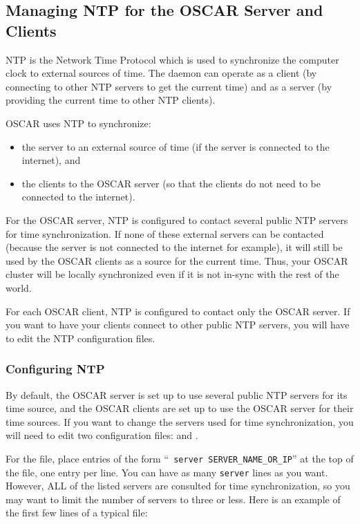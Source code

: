 %
%
%

\subsection{Managing NTP for the OSCAR Server and Clients}
\label{app:ntp-overview}

NTP is the Network Time Protocol which is used to synchronize the
computer clock to external sources of time.  The  daemon
can operate as a client (by connecting to other NTP servers to get the
current time) and as a server (by providing the current time to other
NTP clients).

\bigskip

OSCAR uses NTP to synchronize:
\begin{itemize}
\item the server to an external source of time (if the server is
  connected to the internet), and
\item the clients to the OSCAR server (so that the clients do not need
  to be connected to the internet).
\end{itemize}

For the OSCAR server, NTP is configured to contact several public NTP
servers for time synchronization.  If none of these external servers
can be contacted (because the server is not connected to the internet
for example), it will still be used by the OSCAR clients as a source
for the current time.  Thus, your OSCAR cluster will be locally
synchronized even if it is not in-sync with the rest of the world.

For each OSCAR client, NTP is configured to contact only the OSCAR
server.  If you want to have your clients connect to other public NTP
servers, you will have to edit the NTP configuration files.

\subsubsection{Configuring NTP}

By default, the OSCAR server is set up to use several public NTP
servers for its time source, and the OSCAR clients are set up to use
the OSCAR server for their time sources.  If you want to change the
servers used for time synchronization, you will need to edit two
configuration files:  and
.

For the  file, place entries of the form ``{\tt
  server SERVER\_NAME\_OR\_IP}'' at the top of the file, one entry per
line.  You can have as many {\tt server} lines as you want.  However,
ALL of the listed servers are consulted for time synchronization, so
you may want to limit the number of servers to three or less.  Here is
an example of the first few lines of a typical 
file:

